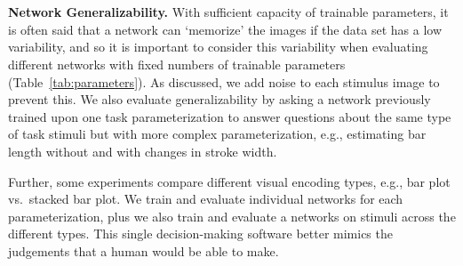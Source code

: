 \\~\\
\noindent\textbf{Network Generalizability.} With sufficient capacity of trainable parameters, it is often said that a network can `memorize' the images if the data set has a low variability, and so it is important to consider this variability when evaluating different networks with fixed numbers of trainable parameters (Table~\ref{tab:parameters}). As discussed, we add noise to each stimulus image to prevent this. We also evaluate generalizability by asking a network previously trained upon one task parameterization to answer questions about the same type of task stimuli but with more complex parameterization, e.g., estimating bar length without and with changes in stroke width.

Further, some experiments compare different visual encoding types, e.g., bar plot vs.~stacked bar plot. We train and evaluate individual networks for each parameterization, plus we also train and evaluate a networks on stimuli across the different types. This single decision-making software better mimics the judgements that a human would be able to make. 

